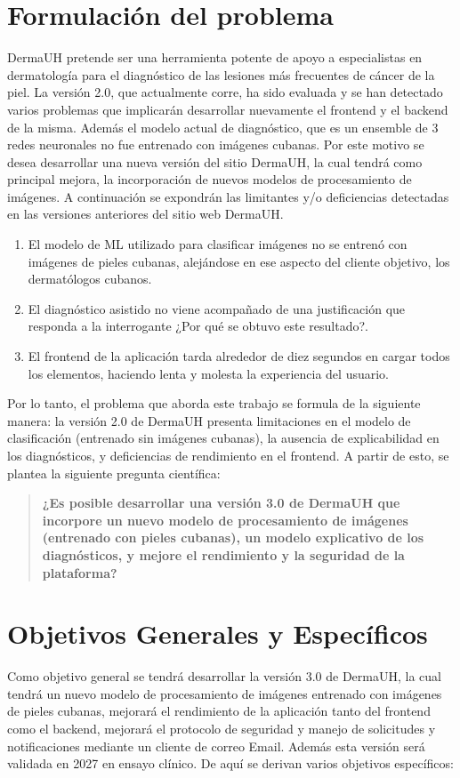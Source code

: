 \section{Formulaci\'on del problema}
DermaUH pretende ser una herramienta potente de apoyo a especialistas en dermatolog\'ia para
el diagn\'ostico de las lesiones m\'as frecuentes de c\'ancer de la piel. La versi\'on 2.0, que
actualmente corre, ha sido evaluada y se han detectado varios problemas que implicar\'an desarrollar
nuevamente el frontend y el backend de la misma. Adem\'as el modelo actual de diagn\'ostico, que 
es un ensemble de 3 redes neuronales no fue entrenado con im\'agenes cubanas.
Por este motivo se desea desarrollar una nueva versi\'on del sitio DermaUH, la cual tendr\'a como 
principal mejora, la incorporaci\'on de nuevos modelos de procesamiento de im\'agenes. A continuaci\'on
se expondr\'an las limitantes y/o deficiencias detectadas en las versiones anteriores del sitio 
web DermaUH.

\begin{enumerate}
    \item El modelo de ML utilizado para clasificar im\'agenes no se entren\'o con im\'agenes de pieles cubanas, alej\'andose en ese aspecto del cliente objetivo, los dermat\'ologos cubanos.
    \item El diagn\'ostico asistido no viene acompa\~nado de una justificaci\'on que responda a la interrogante ¿Por qué se obtuvo este resultado?.
    \item El frontend de la aplicaci\'on tarda alrededor de diez segundos en cargar todos los elementos, haciendo lenta y molesta la experiencia del usuario.
\end{enumerate}

Por lo tanto, el problema que aborda este trabajo se formula de la siguiente manera: 
la versión 2.0 de DermaUH presenta limitaciones en el modelo de clasificación 
(entrenado sin imágenes cubanas), la ausencia de explicabilidad en los diagnósticos, y 
deficiencias de rendimiento en el frontend. A partir de esto, se plantea la siguiente 
pregunta científica:

\begin{quote}
\textbf{¿Es posible desarrollar una versión 3.0 de DermaUH que incorpore un nuevo modelo 
de procesamiento de imágenes (entrenado con pieles cubanas), un modelo explicativo de los 
diagnósticos, y mejore el rendimiento y la seguridad de la plataforma?}
\end{quote}

\section{Objetivos Generales y Espec\'ificos}
Como objetivo general se tendr\'a desarrollar la versi\'on 3.0 de DermaUH, la cual tendr\'a un nuevo
modelo de procesamiento de im\'agenes entrenado con im\'agenes de pieles cubanas, mejorar\'a el rendimiento
de la aplicaci\'on tanto del frontend como el backend, mejorar\'a el protocolo de seguridad y manejo de solicitudes
y notificaciones mediante un cliente de correo Email. Adem\'as esta versi\'on ser\'a validada en 2027
en ensayo cl\'inico. De aqu\'i se derivan varios objetivos espec\'ificos:

